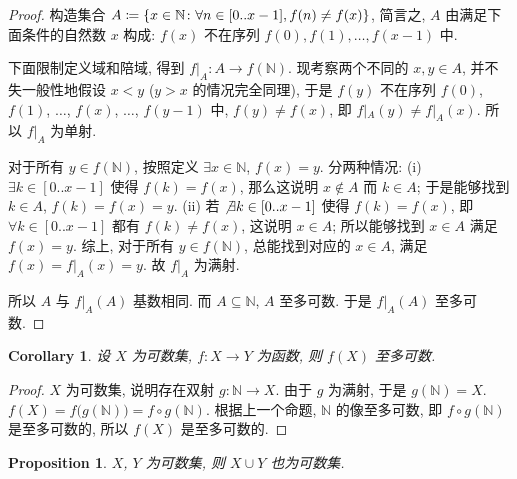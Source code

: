 \documentclass[UTF8]{ctexart}
\theoremstyle{mystyle}
\newtheorem{proposition}{Proposition}[section]
\theoremstyle{myremark}
\theoremstyle{plain}
\newtheorem{corollary}{Corollary}[section]
\newcommand{\N}{\mathbb N}
\DeclarePairedDelimiter\set{\{}{\}}
\begin{document}
\begin{proof}
    构造集合 $ A \coloneqq \set{x \in \N \colon \forall n \in [0 .. x - 1], f(n) \neq f(x)} $, 简言之, $ A $ 由满足下面条件的自然数 $ x $ 构成: $ f(x) $ 不在序列 $ f(0), f(1), \dots, f(x - 1) $ 中.

    下面限制定义域和陪域, 得到 $ f|_A \colon A \to f(\N) $. 现考察两个不同的 $ x, y \in A $, 并不失一般性地假设 $ x < y $ ($ y > x $ 的情况完全同理), 于是 $ f(y) $ 不在序列 $ f(0)$, $ f (1) $, $ \dots $, $ f(x) $, $ \dots $, $ f(y - 1) $ 中, $ f(y) \neq f(x) $, 即 $ f|_A (y) \neq f|_A (x) $. 所以 $ f|_A $ 为单射.

    对于所有 $ y \in f(\N) $, 按照定义 $ \exists x \in \N $, $ f(x) = y $. 分两种情况: (i) $ \exists k \in [0 .. x - 1] $ 使得 $ f(k) = f(x) $, 那么这说明 $ x \notin A $ 而 $ k \in A $; 于是能够找到 $ k \in A $, $ f(k) = f(x) = y $. (ii) 若 $ \not\exists k \in [0 .. x - 1] $ 使得 $ f(k) = f(x) $, 即 $ \forall k \in [0 .. x - 1] $ 都有 $ f(k) \neq f(x) $, 这说明 $ x \in A $; 所以能够找到 $ x \in A $ 满足 $ f(x) = y $. 综上, 对于所有 $ y \in f(\N) $, 总能找到对应的 $ x \in A $, 满足 $ f(x) = f|_A(x) = y $. 故 $ f|_A $ 为满射.

    所以 $ A $ 与 $ f|_A (A) $ 基数相同. 而 $ A \subseteq \N $, $ A $ 至多可数. 于是 $ f|_A (A) $ 至多可数.
\end{proof}

\begin{corollary} \label{at most countable II-1}
    设 $ X $ 为可数集, $ f \colon X \to Y $ 为函数, 则 $ f(X) $ 至多可数.
\end{corollary} 

\begin{proof}
    $ X $ 为可数集, 说明存在双射 $ g \colon \N \to X $. 由于 $ g $ 为满射, 于是 $ g(\N) = X $. $ f(X) = f \big( g (\N) \big) = f \circ g (\N) $. 根据上一个命题, $ \N $ 的像至多可数, 即 $ f \circ g (\N) $ 是至多可数的, 所以 $ f(X) $ 是至多可数的.
\end{proof}

\begin{proposition} \label{at most countable III}
    $ X $, $ Y $ 为可数集, 则 $ X \cup Y $ 也为可数集.
\end{proposition}
\end{document}
